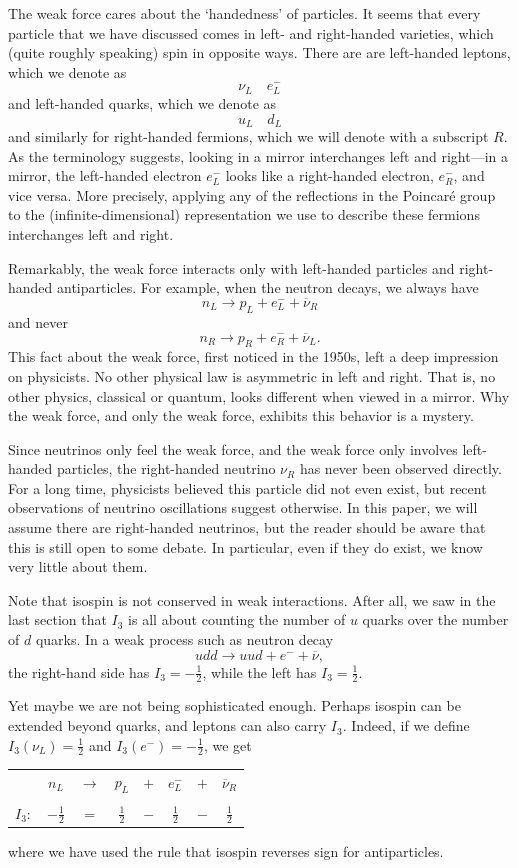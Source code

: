\documentclass{article}
\newcommand{\half}{\frac{1}{2}} %
\newcommand{\nubar}{\overline{\nu}} %
\begin{document}
The weak force cares about the `handedness' of particles.  It seems
that every particle that we have discussed comes in left- and right-handed 
varieties, which (quite roughly speaking) spin in opposite ways.  There are
are left-handed leptons, which we denote as
\[ \nu_L \quad e^-_L \]
and left-handed quarks, which we denote as
\[ u_L \quad d_L \]
and similarly for right-handed fermions, which we will denote with a subscript
$R$. As the terminology suggests, looking in a mirror interchanges left and
right---in a mirror, the left-handed electron $e^-_L$ looks like a 
right-handed
electron, $e^-_R$, and vice versa. More precisely, applying any of the
reflections in the Poincar\'e group to the (infinite-dimensional)
representation we use to describe these fermions interchanges left and right.

Remarkably, the weak force interacts only with left-handed particles and
right-handed antiparticles. For example, when the neutron decays, we always
have
\[ n_L \to p_L + e^-_L + \nubar_R \]
and never 
\[ n_R \to p_R + e^-_R + \nubar_L. \]
This fact about the weak force, first noticed in the 1950s, left a deep
impression on physicists. No other physical law is asymmetric in left and
right. That is, no other physics, classical or quantum, looks different when
viewed in a mirror. Why the weak force, and only the weak force, exhibits this
behavior is a mystery.

Since neutrinos only feel the weak force, and the weak force only involves
left-handed particles, the right-handed neutrino $\nu_R$ has never been
observed directly. For a long time, physicists believed this particle did not 
even exist, but recent observations of neutrino oscillations suggest otherwise. In this paper, we will assume there are right-handed neutrinos, but the reader
should be aware that this is still open to some debate. In particular, even if
they do exist, we know very little about them. 

Note that isospin is not conserved in weak interactions. After all, we saw in
the last section that $I_3$ is all about counting the number of $u$ quarks over
the number of $d$ quarks. In a weak process such as neutron decay
\[ udd \to uud + e^- + \nubar, \]
the right-hand side has $I_3 = -\half$, while the left has $I_3 = \half$. 

Yet maybe we are not being sophisticated enough. Perhaps isospin can be
extended beyond quarks, and leptons can also carry $I_3$. Indeed, if we define
$I_3( \nu_L ) = \half$ and $I_3( e^- ) = -\half$, we get
\begin{center}
	\begin{tabular}{lccccccc}
		 & $n_L$    & $\to$ & $p_L$   & $+$  &  $e_L^-$ & $+$ & $\nubar_R$ \\
\\
		$I_3:$   & $-\half$ & $=$   & $\half$ & $-$  &  $\half$ & $-$ & $\half$ \\
	\end{tabular}
\end{center}
where we have used the rule that isospin reverses sign for antiparticles.
\end{document}
